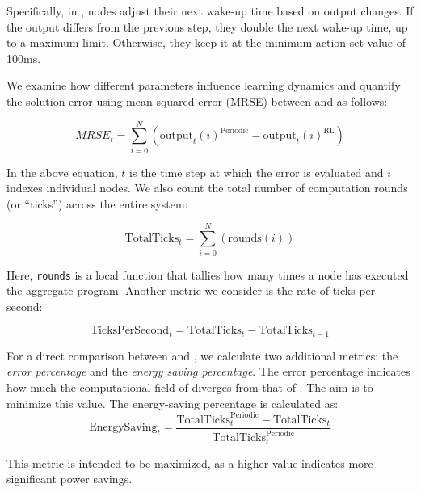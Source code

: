 Specifically, in \adhocsol{}, nodes adjust their next wake-up time based on output changes. 
 If the output differs from the previous step, 
 they double the next wake-up time, up to a maximum limit. Otherwise, they keep it at the minimum action set value of 100ms.
 
We examine how different parameters influence learning dynamics and quantify the solution error using mean squared error (MRSE) between \periodicsol{} and \rlsol{} as follows:
 
 \begin{equation}
     MRSE_t = \sum_{i=0}^{N} (\text{output}_t(i)^{\text{Periodic}} - \text{output}_t(i)^{\text{RL}})
 \end{equation}
 
 In the above equation, $t$ is the time step at which the error is evaluated and $i$ indexes individual nodes. 
  We also count the total number of computation rounds (or ``ticks'') across the entire system:
 
 \begin{equation}
     \text{TotalTicks}_t = \sum_{i=0}^{N} (\text{rounds}(i))
 \end{equation}
 
 Here, \texttt{rounds} is a local function that tallies how many times a node has executed the aggregate program. 
  Another metric we consider is the rate of ticks per second:
 
 \begin{equation}
     \text{TicksPerSecond}_t = \text{TotalTicks}_t - \text{TotalTicks}_{t-1}
 \end{equation}
 
For a direct comparison between \rlsol{} and \adhocsol{}, 
 we calculate two additional metrics: 
 the \emph{error percentage} and the \emph{energy saving percentage}. 
% 
The error percentage indicates how much the computational field of \rlsol{} diverges from that of \periodicsol{}. 
 The aim is to minimize this value. 
 The energy-saving percentage is calculated as:
 \begin{equation}
     \text{EnergySaving}_t = \frac{\text{TotalTicks}^{\text{Periodic}}_t - \text{TotalTicks}_t}{\text{TotalTicks}^{\text{Periodic}}_t}
 \end{equation}
 
This metric is intended to be maximized, 
 as a higher value indicates more significant power savings.
